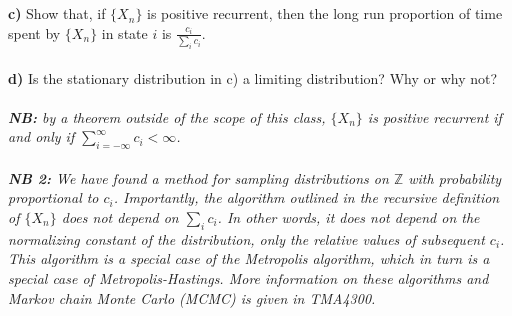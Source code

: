\documentclass[1p]{article}		%
\begin{document}
\\\\
\noindent
\textbf{c)} Show that, if $\{X_n\}$ is positive recurrent, then the long run proportion of time spent by $\{X_n\}$ in state $i$ is $\frac{c_i}{\sum_i c_i}$.\\\\
\noindent
\textbf{d)} Is the stationary distribution in c) a limiting distribution? Why or why not?\\\\
\noindent
\emph{\textbf{NB:} by a theorem outside of the scope of this class, $\{X_n\}$ is positive recurrent if and only if $\sum_{i=-\infty}^\infty c_i < \infty$.}\\\\
\noindent
\emph{\textbf{NB 2:} We have found a method for sampling distributions on $\mathbb{Z}$ with probability proportional to $c_i$. Importantly, the algorithm outlined in the recursive definition of $\{X_n\}$ does not depend on $\sum_i c_i$. In other words, it does not depend on the \emph{normalizing constant} of the distribution, only the relative values of subsequent $c_i$. This algorithm is a special case of the Metropolis algorithm, which in turn is a special case of Metropolis-Hastings. More information on these algorithms and Markov chain Monte Carlo (MCMC) is given in TMA4300.}
\end{document}
